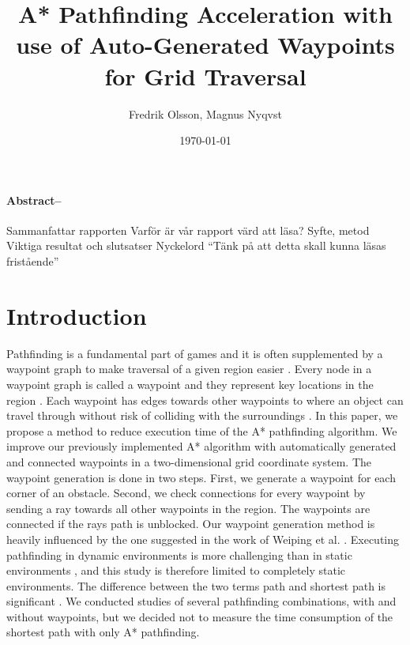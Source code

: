 \documentclass[a4paper]{article}
\title{A* Pathfinding Acceleration with use of Auto-Generated Waypoints for Grid Traversal}
\author{Fredrik Olsson, Magnus Nyqvst}
\date{\today}
\begin{document}
\maketitle
\newpage
\thispagestyle{empty}
\paragraph{Abstract--}
Sammanfattar rapporten
Varför är vår rapport värd att läsa?
Syfte, metod
Viktiga resultat och slutsatser Nyckelord
“Tänk på att detta skall kunna läsas fristående”

\tableofcontents
\listoffigures
\newpage
{}
\twocolumn
\section{Introduction}
Pathfinding is a fundamental part of games \cite{dynaPF15}\cite{roboGame15} and it is often supplemented by a waypoint graph to make traversal of a given region easier \cite{dynaPF15}. Every node in a waypoint graph is called a waypoint and they represent key locations in the region \cite{dynaPF15}. Each waypoint has edges towards other waypoints to where an object can travel through without risk of colliding with the surroundings \cite{dynaPF15}.\newline
In this paper, we propose a method to reduce execution time of the A* pathfinding algorithm. We improve our previously implemented A* algorithm with automatically generated and connected waypoints in a two-dimensional grid coordinate system. The waypoint generation is done in two steps. First, we generate a waypoint for each corner of an obstacle. Second, we check connections for every waypoint by sending a ray towards all other waypoints in the region. The waypoints are connected if the rays path is unblocked. Our waypoint generation method is heavily influenced by the one suggested in the work of Weiping et al. \cite{dynaPF15}.\newline
Executing pathfinding in dynamic environments is more challenging than in static environments \cite{dynaPF15}, and this study is therefore limited to completely static environments. The difference between the two terms path and shortest path is significant \cite{heuristicGame15}. We conducted studies of several pathfinding combinations, with and without waypoints, but we decided not to measure the time consumption of the shortest path with only A* pathfinding.
\end{document}
